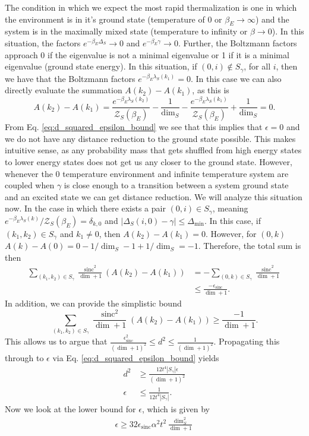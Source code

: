 \documentclass{article}
\newcommand{\partfun}{\mathcal{Z}}
\DeclareMathOperator{\sinc}{sinc}
\begin{document}
The condition in which we expect the most rapid thermalization is one in which the environment is in it's ground state (temperature of 0 or $\beta_E \to \infty$) and the system is in the maximally mixed state (temperature to infinity or $\beta \to 0$). In this situation, the factors $e^{-\beta_E \Delta_S} \to 0$ and $e^{-\beta_E \gamma} \to 0$. Further, the Boltzmann factors approach 0 if the eigenvalue is not a minimal eigenvalue or 1 if it is a minimal eigenvalue (ground state energy). In this situation, if $(0, i) \notin S_{\gamma}$, for all $i$, then we have that the Boltzmann factors $e^{-\beta_E \lambda_S(k_1)} = 0$. In this case we can also directly evaluate the summation $A(k_2) - A(k_1)$, as this is 
\begin{equation}
    A(k_2) - A(k_1) = \frac{e^{-\beta_E \lambda_S(k_2)}}{\partfun_S(\beta_E)} - \frac{1}{\dim_S} - \frac{e^{-\beta_E \lambda_S(k_1)}}{\partfun_S(\beta_E)} + \frac{1}{\dim_S} = 0.
\end{equation}
From Eq. \eqref{eq:d_squared_epsilon_bound} we see that this implies that $\epsilon = 0$ and we do not have any distance reduction to the ground state possible. This makes intuitive sense, as any probability mass that gets shuffled from high energy states to lower energy states does not get us any closer to the ground state. 
However, whenever the 0 temperature environment and infinite temperature system are coupled when $\gamma$ is close enough to a transition between a system ground state and an excited state we can get distance reduction. We will analyze this situation now. In the case in which there exists a pair $(0, i) \in S_{\gamma}$, meaning $e^{-\beta_E \lambda_S(k)} / \partfun_S(\beta_E) = \delta_{k,0}$ and $|\Delta_S(i, 0) - \gamma| \leq \Delta_{\min}$. In this case, if $(k_1, k_2) \in S_{\gamma}$ and $k_1 \neq 0$, then $A(k_2) - A(k_1) = 0$. However, for $(0, k)$ $A(k) - A(0) = 0 - 1/\dim_S - 1 + 1/\dim_S = -1$. Therefore, the total sum is then 
\begin{align}
    \sum_{(k_1, k_2) \in S_{\gamma}} \frac{\sinc^2}{\dim + 1} (A(k_2) - A(k_1)) &= - \sum_{(0, k) \in S_{\gamma}} \frac{\sinc^2}{\dim + 1} \\
    &\leq \frac{- \epsilon_{\sinc}}{\dim + 1}.
\end{align}
In addition, we can provide the simplistic bound 
\begin{equation}
    \sum_{(k_1, k_2) \in S_{\gamma}} \frac{\sinc^2}{\dim + 1}(A(k_2) - A(k_1)) \geq \frac{-1}{\dim + 1}.
\end{equation}
This allows us to argue that $\frac{\epsilon_{\sinc}^2}{(\dim + 1)^2} \leq d^2 \leq \frac{1}{(\dim + 1)^2}$. Propagating this through to $\epsilon$ via Eq. \eqref{eq:d_squared_epsilon_bound} yields 
\begin{align}
    d^2 &\geq \frac{12 t^4 |S_{\gamma}| \epsilon}{(\dim + 1)^2} \\
    \epsilon &\leq \frac{1}{12 t^4 |S_{\gamma}|}.
\end{align}
Now we look at the lower bound for $\epsilon$, which is given by 
\begin{align}
    \epsilon \geq 32 \epsilon_{\sinc} \alpha^2 t^2 \frac{\dim_S^2}{\dim + 1}
\end{align}
\end{document}
